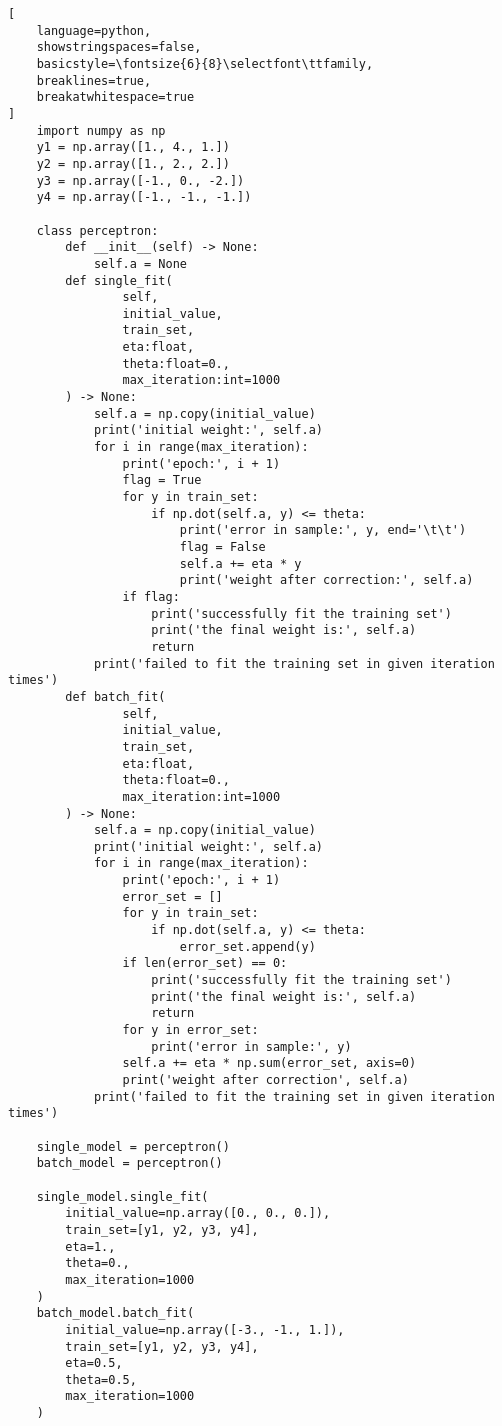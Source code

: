 \documentclass{article}
\begin{document}
\begin{multicols}{2}
\begin{lstlisting}[
    language=python, 
    showstringspaces=false, 
    basicstyle=\fontsize{6}{8}\selectfont\ttfamily, 
    breaklines=true, 
    breakatwhitespace=true
]
    import numpy as np
    y1 = np.array([1., 4., 1.])
    y2 = np.array([1., 2., 2.])
    y3 = np.array([-1., 0., -2.])
    y4 = np.array([-1., -1., -1.])

    class perceptron:
        def __init__(self) -> None:
            self.a = None
        def single_fit(
                self, 
                initial_value,
                train_set, 
                eta:float, 
                theta:float=0., 
                max_iteration:int=1000
        ) -> None:
            self.a = np.copy(initial_value)
            print('initial weight:', self.a)
            for i in range(max_iteration):
                print('epoch:', i + 1)
                flag = True
                for y in train_set:
                    if np.dot(self.a, y) <= theta:
                        print('error in sample:', y, end='\t\t')
                        flag = False
                        self.a += eta * y
                        print('weight after correction:', self.a)
                if flag:
                    print('successfully fit the training set')
                    print('the final weight is:', self.a)
                    return
            print('failed to fit the training set in given iteration times')
        def batch_fit(
                self, 
                initial_value,
                train_set, 
                eta:float, 
                theta:float=0., 
                max_iteration:int=1000
        ) -> None:
            self.a = np.copy(initial_value)
            print('initial weight:', self.a)
            for i in range(max_iteration):
                print('epoch:', i + 1)
                error_set = []
                for y in train_set:
                    if np.dot(self.a, y) <= theta:
                        error_set.append(y)
                if len(error_set) == 0:
                    print('successfully fit the training set')
                    print('the final weight is:', self.a)
                    return
                for y in error_set:
                    print('error in sample:', y)
                self.a += eta * np.sum(error_set, axis=0)
                print('weight after correction', self.a)
            print('failed to fit the training set in given iteration times')

    single_model = perceptron()
    batch_model = perceptron()

    single_model.single_fit(
        initial_value=np.array([0., 0., 0.]),
        train_set=[y1, y2, y3, y4],
        eta=1.,
        theta=0.,
        max_iteration=1000
    )
    batch_model.batch_fit(
        initial_value=np.array([-3., -1., 1.]),
        train_set=[y1, y2, y3, y4],
        eta=0.5,
        theta=0.5,
        max_iteration=1000
    )
\end{lstlisting}
\end{multicols}
\end{document}
